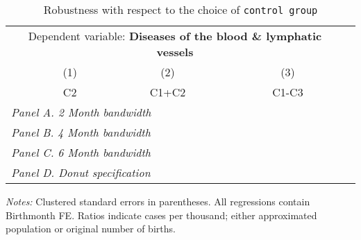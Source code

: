  \begin{table}[H] \begin{threeparttable} \centering \caption{Robustness with respect to the choice of \texttt{control group}} {\def\sym#1{\ifmmode^{#1}\else\(^{#1}\)\fi} \begin{tabular}{l*{4}{c}} \toprule \multicolumn{4}{c}{Dependent variable: \textbf{Diseases of the blood \& lymphatic vessels}} \\ \cmidrule(lr){2-4}
            &\multicolumn{1}{c}{(1)}&\multicolumn{1}{c}{(2)}&\multicolumn{1}{c}{(3)}\\
            &\multicolumn{1}{c}{C2}&\multicolumn{1}{c}{C1+C2}&\multicolumn{1}{c}{C1-C3}\\
\midrule
 \multicolumn{4}{l}{\emph{Panel A. 2 Month bandwidth}} \\    \midrule\multicolumn{4}{l}{\emph{Panel B. 4 Month bandwidth}} \\    \midrule\multicolumn{4}{l}{\emph{Panel C. 6 Month bandwidth}} \\    \midrule\multicolumn{4}{l}{\emph{Panel D. Donut specification}} \\    
\bottomrule \end{tabular} } \begin{tablenotes} \item \scriptsize \emph{Notes:} Clustered standard errors in parentheses. All regressions contain Birthmonth FE. Ratios indicate cases per thousand; either approximated population or original number of births. \end{tablenotes} \end{threeparttable} \end{table} 
